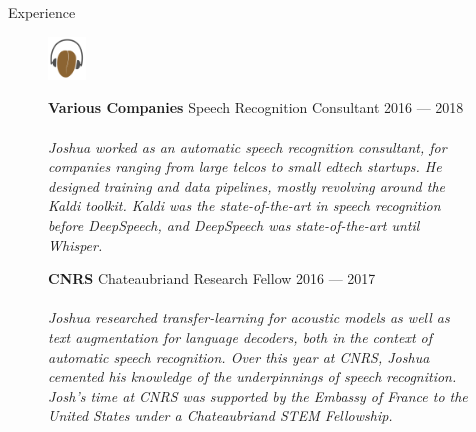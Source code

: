 \documentclass{cv} %
\begin{document}
\begin{rSection}{Experience}
  \begin{figure}[H]
    \begin{minipage}{0.2\textwidth}
      \centering
      \includegraphics[width=1cm]{imgs/kaldi-logo.png}
    \end{minipage}
    \begin{minipage}{0.8\textwidth}
      {\bf Various Companies} \hfill Speech Recognition Consultant \hspace{0.5cm} {2016 --- 2018} \\ \\
      \textit{Joshua worked as an automatic speech recognition consultant, for companies ranging from large telcos to small edtech startups. He designed training and data pipelines, mostly revolving around the Kaldi toolkit. Kaldi was the state-of-the-art in speech recognition before DeepSpeech, and DeepSpeech was state-of-the-art until Whisper.} \\
    \end{minipage}
  \end{figure}

  \begin{figure}[H]
    \begin{minipage}{0.2\textwidth}
      \centering
      
    \end{minipage}
    \begin{minipage}{0.8\textwidth}
      {\bf CNRS} \hfill Chateaubriand Research Fellow  \hspace{0.5cm} {2016 --- 2017} \\ \\
      \textit{Joshua researched transfer-learning for acoustic models as well as text augmentation for language decoders, both in the context of automatic speech recognition. Over this year at CNRS, Joshua cemented his knowledge of the underpinnings of speech recognition. Josh's time at CNRS was supported by the Embassy of France to the United States under a Chateaubriand STEM Fellowship.}
    \end{minipage}
  \end{figure}


\end{rSection}
\end{document}
